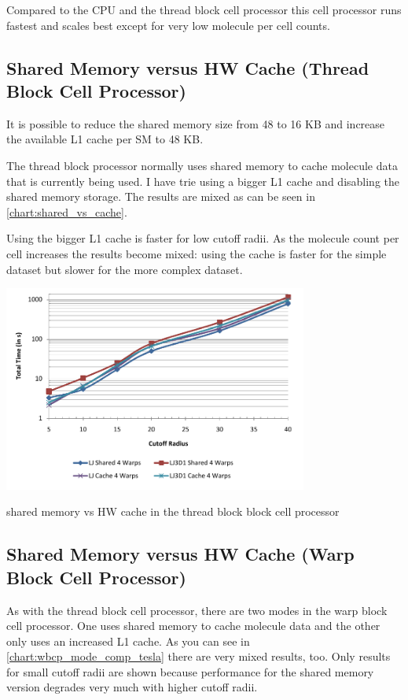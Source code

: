 Compared to the CPU and the thread block cell processor this cell processor runs fastest and scales best except for very low molecule per cell counts.

\subsection{Shared Memory versus HW Cache (Thread Block Cell Processor)}
It is possible to reduce the shared memory size from 48 to 16 KB and increase the available L1 cache per SM to 48 KB.

The thread block processor normally uses shared memory to cache molecule data that is currently being used.
I have trie using a bigger L1 cache and disabling the shared memory storage. The results are mixed as can be seen in \autoref{chart:shared_vs_cache}.

Using the bigger L1 cache is faster for low cutoff radii. As the molecule count per cell increases the results become mixed: using the cache is faster for the simple  dataset but slower for the more complex  dataset.
\begin{chart}
\centering
\includegraphics[width=0.75\textwidth]{plots/shared_vs_cached_tb_tesla.pdf}
\caption{shared memory vs HW cache in the thread block block cell processor}
\label{chart:shared_vs_cache}
\end{chart}

\subsection{Shared Memory versus HW Cache (Warp Block Cell Processor)}
As with the thread block cell processor, there are two modes in the warp block cell processor. One uses shared memory to cache molecule data and the other only uses an increased L1 cache.
As you can see in \autoref{chart:wbcp_mode_comp_tesla} there are very mixed results, too. Only results for small cutoff radii are shown because performance for the shared memory version degrades very much with higher cutoff radii.

